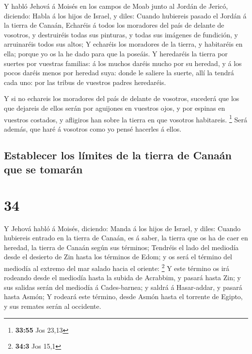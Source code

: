  Y habló Jehová á Moisés en los campos de Moab junto al
Jordán de Jericó, diciendo:  Habla á los hijos de Israel,
y diles: Cuando hubiereis pasado el Jordán á la tierra de Canaán,
 Echaréis á todos los moradores del país de delante de
vosotros, y destruiréis todas sus pinturas, y todas sus imágenes de
fundición, y arruinaréis todos sus altos;  Y echaréis los
moradores de la tierra, y habitaréis en ella; porque yo os la he dado
para que la poseáis.  Y heredaréis la tierra por suertes
por vuestras familias: á los muchos daréis mucho por su heredad, y á los
pocos daréis menos por heredad suya: donde le saliere la suerte, allí la
tendrá cada uno: por las tribus de vuestros padres heredaréis.

 Y si no echareis los moradores del país de delante de
vosotros, sucederá que los que dejareis de ellos serán por aguijones en
vuestros ojos, y por espinas en vuestros costados, y afligiros han sobre
la tierra en que vosotros habitareis. \footnote{\textbf{33:55} Jos 23,13}
 Será además, que haré á vosotros como yo pensé hacerles
á ellos.

\hypertarget{establecer-los-luxedmites-de-la-tierra-de-canauxe1n-que-se-tomaruxe1n}{%
\subsection{Establecer los límites de la tierra de Canaán que se
tomarán}\label{establecer-los-luxedmites-de-la-tierra-de-canauxe1n-que-se-tomaruxe1n}}

\hypertarget{section-33}{%
\section{34}\label{section-33}}

 Y Jehová habló á Moisés, diciendo:  Manda á
los hijos de Israel, y diles: Cuando hubiereis entrado en la tierra de
Canaán, es á saber, la tierra que os ha de caer en heredad, la tierra de
Canaán según sus términos;  Tendréis el lado del mediodía
desde el desierto de Zin hasta los términos de Edom; y os será el
término del mediodía al extremo del mar salado hacia el oriente:
\footnote{\textbf{34:3} Jos 15,1}  Y este término os irá
rodeando desde el mediodía hasta la subida de Acrabbim, y pasará hasta
Zin; y sus salidas serán del mediodía á Cades-barnea; y saldrá á
Hasar-addar, y pasará hasta Asmón;  Y rodeará este
término, desde Asmón hasta el torrente de Egipto, y sus remates serán al
occidente.

